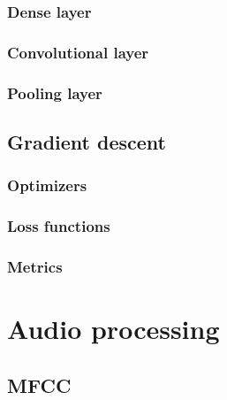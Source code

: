 
\subsubsection{Dense layer}

\subsubsection{Convolutional layer}

\subsubsection{Pooling layer}


\subsection{Gradient descent}

\subsubsection{Optimizers}

\subsubsection{Loss functions}

\subsubsection{Metrics}

\section{Audio processing}

\subsection{MFCC}

